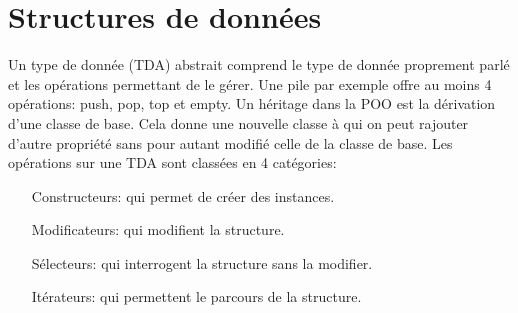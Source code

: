 \documentclass{article}
\begin{document}
\section{Structures de données}
Un type de donnée (TDA) abstrait comprend le type de donnée proprement parlé et les opérations permettant de le gérer.
Une pile par exemple offre au moins 4 opérations: push, pop, top et empty. 
Un héritage dans la POO est la dérivation d'une classe de base. Cela donne une nouvelle classe à qui on peut rajouter d'autre propriété sans pour autant modifié celle de la classe de base. 
Les opérations sur une TDA sont classées en 4 catégories:
\begin{itemize}
	\item[Constructeurs:] qui permet de créer des instances.
	\item[Modificateurs:] qui modifient la structure.
	\item[Sélecteurs:] qui interrogent la structure sans la modifier.
	\item[Itérateurs:] qui permettent le parcours de la structure. 
\end{itemize}
\end{document}
